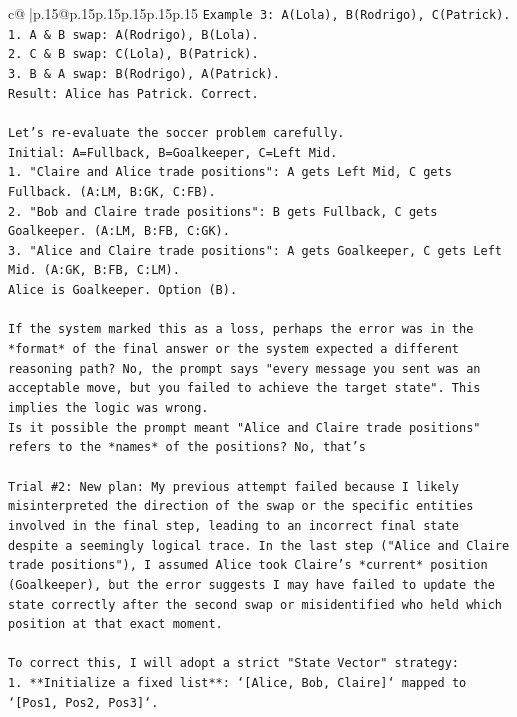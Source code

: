 \documentclass{article}
\begin{document}
{\begin{supertabular}{c@{$\;$}|p{.15\linewidth}@{}p{.15\linewidth}p{.15\linewidth}p{.15\linewidth}p{.15\linewidth}p{.15\linewidth}}
{{{\texttt{Example 3: A(Lola), B(Rodrigo), C(Patrick).} \\
\texttt{1. A \& B swap: A(Rodrigo), B(Lola).} \\
\texttt{2. C \& B swap: C(Lola), B(Patrick).} \\
\texttt{3. B \& A swap: B(Rodrigo), A(Patrick).} \\
\texttt{Result: Alice has Patrick. Correct.} \\
\\ 
\texttt{Let's re{-}evaluate the soccer problem carefully.} \\
\texttt{Initial: A=Fullback, B=Goalkeeper, C=Left Mid.} \\
\texttt{1. "Claire and Alice trade positions": A gets Left Mid, C gets Fullback. (A:LM, B:GK, C:FB).} \\
\texttt{2. "Bob and Claire trade positions": B gets Fullback, C gets Goalkeeper. (A:LM, B:FB, C:GK).} \\
\texttt{3. "Alice and Claire trade positions": A gets Goalkeeper, C gets Left Mid. (A:GK, B:FB, C:LM).} \\
\texttt{Alice is Goalkeeper. Option (B).} \\
\\ 
\texttt{If the system marked this as a loss, perhaps the error was in the *format* of the final answer or the system expected a different reasoning path? No, the prompt says "every message you sent was an acceptable move, but you failed to achieve the target state". This implies the logic was wrong.} \\
\texttt{Is it possible the prompt meant "Alice and Claire trade positions" refers to the *names* of the positions? No, that's} \\
\\ 
\texttt{Trial \#2: New plan: My previous attempt failed because I likely misinterpreted the direction of the swap or the specific entities involved in the final step, leading to an incorrect final state despite a seemingly logical trace. In the last step ("Alice and Claire trade positions"), I assumed Alice took Claire's *current* position (Goalkeeper), but the error suggests I may have failed to update the state correctly after the second swap or misidentified who held which position at that exact moment.} \\
\\ 
\texttt{To correct this, I will adopt a strict "State Vector" strategy:} \\
\texttt{1.  **Initialize a fixed list**: `{[}Alice, Bob, Claire{]}` mapped to `{[}Pos1, Pos2, Pos3{]}`.} \\
}}}
\end{supertabular}}
\end{document}
